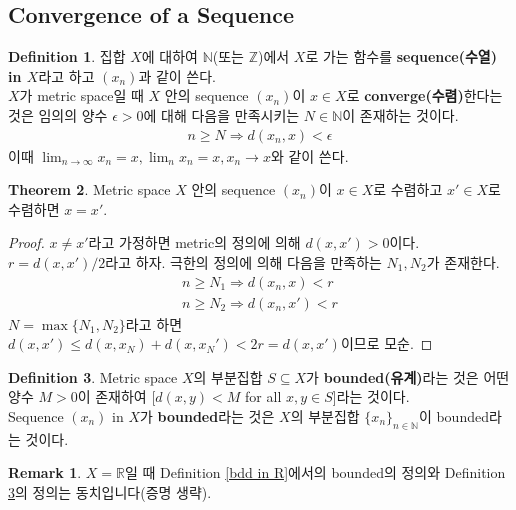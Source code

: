 \documentclass[12pt]{article}
\theoremstyle{definition}
\newtheorem{thm}{Theorem}[section]
\newtheorem{defn}[thm]{Definition}
\newtheorem*{rem}{Remark}
\def\NN{\mathbb{N}}
\def\ZZ{\mathbb{Z}}
\def\RR{\mathbb{R}}
\def\eps{\epsilon}
\begin{document}
\subsection{Convergence of a Sequence}

	\begin{defn} \label{converge}
		집합 \(X\)에 대하여 \(\NN\)(또는 \(\ZZ\))에서 \(X\)로 가는 함수를 \textbf{sequence(수열) in \(X\)}라고 하고 \((x_n)\)과 같이 쓴다.\\
		\(X\)가 metric space일 때 \(X\) 안의 sequence \((x_n)\)이 \(x \in X\)로 \textbf{converge(수렴)}한다는 것은 임의의 양수 \(\eps > 0\)에 대해 다음을 만족시키는 \(N \in \NN\)이 존재하는 것이다.
		\begin{gather*}
			n \ge N \Longrightarrow d(x_n, x) < \eps
		\end{gather*}
		이때 \(\lim_{n \rightarrow \infty}x_n = x, \lim_n x_n = x, x_n \rightarrow x\)와 같이 쓴다.
	\end{defn}

	\begin{thm} \label{thm metric limit unq}
		Metric space \(X\) 안의 sequence \((x_n)\)이 \(x \in X\)로 수렴하고 \(x' \in X\)로 수렴하면 \(x = x'\).
	\end{thm}
	\begin{proof}
		\(x \neq x'\)라고 가정하면 metric의 정의에 의해 \(d(x, x') > 0\)이다. \(r = d(x, x') / 2\)라고 하자. 극한의 정의에 의해 다음을 만족하는 \(N_1, N_2\)가 존재한다.
		\begin{gather*}
			n \ge N_1 \Longrightarrow d(x_n, x) < r\\
			n \ge N_2 \Longrightarrow d(x_n, x') < r
		\end{gather*}
		\(N = \max\{N_1, N_2\}\)라고 하면 \(d(x, x') \le d(x, x_N) + d(x, x_N') < 2r = d(x, x')\)이므로 모순.
	\end{proof}

	\begin{defn} \label{bdd}
		Metric space \(X\)의 부분집합 \(S \subseteq X\)가 \textbf{bounded(유계)}라는 것은 어떤 양수 \(M > 0\)이 존재하여 [\(d(x, y) < M\) for all \(x, y \in S\)]라는 것이다.\\
		Sequence \((x_n)\) in \(X\)가 \textbf{bounded}라는 것은 \(X\)의 부분집합 \(\{x_n\}_{n \in \NN}\)이 bounded라는 것이다.
	\end{defn}
	
	\begin{rem}
		\(X = \RR\)일 때 Definition \ref{bdd in R}에서의 bounded의 정의와 Definition \ref{bdd}의 정의는 동치입니다(증명 생략).
	\end{rem}
\end{document}
